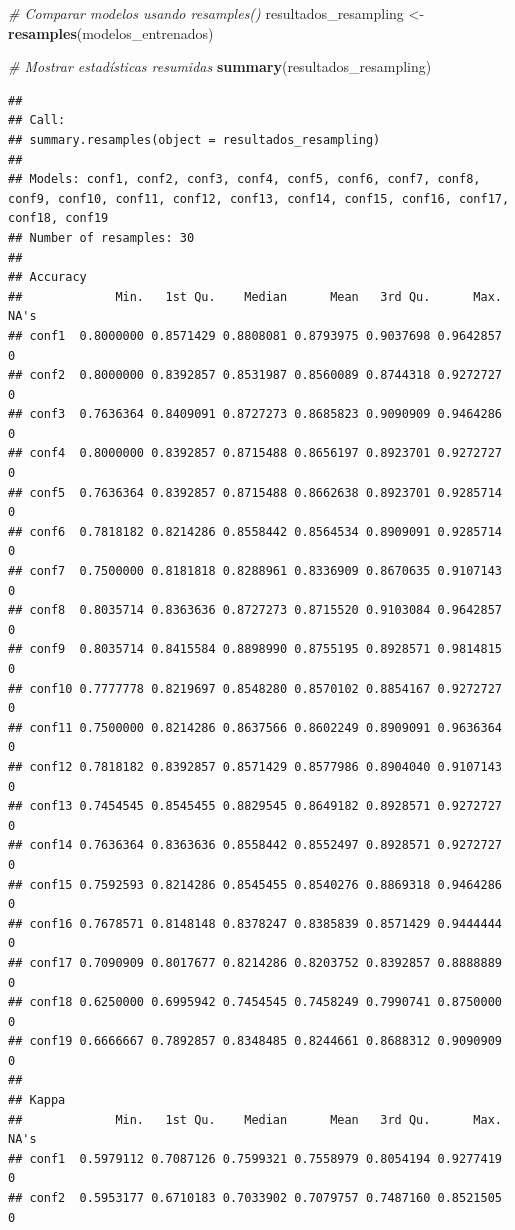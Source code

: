 \documentclass[
]{article}
\newenvironment{Shaded}{\begin{snugshade}}{\end{snugshade}}
\newcommand{\CommentTok}[1]{\textcolor[rgb]{0.56,0.35,0.01}{\textit{#1}}}
\newcommand{\FunctionTok}[1]{\textcolor[rgb]{0.13,0.29,0.53}{\textbf{#1}}}
\newcommand{\NormalTok}[1]{#1}
\newcommand{\OtherTok}[1]{\textcolor[rgb]{0.56,0.35,0.01}{#1}}
\begin{document}
\begin{Shaded}
\begin{Highlighting}[]
\CommentTok{\# Comparar modelos usando resamples()}
\NormalTok{resultados\_resampling }\OtherTok{\textless{}{-}} \FunctionTok{resamples}\NormalTok{(modelos\_entrenados)}

\CommentTok{\# Mostrar estadísticas resumidas}
\FunctionTok{summary}\NormalTok{(resultados\_resampling)}
\end{Highlighting}
\end{Shaded}

\begin{verbatim}
## 
## Call:
## summary.resamples(object = resultados_resampling)
## 
## Models: conf1, conf2, conf3, conf4, conf5, conf6, conf7, conf8, conf9, conf10, conf11, conf12, conf13, conf14, conf15, conf16, conf17, conf18, conf19 
## Number of resamples: 30 
## 
## Accuracy 
##             Min.   1st Qu.    Median      Mean   3rd Qu.      Max. NA's
## conf1  0.8000000 0.8571429 0.8808081 0.8793975 0.9037698 0.9642857    0
## conf2  0.8000000 0.8392857 0.8531987 0.8560089 0.8744318 0.9272727    0
## conf3  0.7636364 0.8409091 0.8727273 0.8685823 0.9090909 0.9464286    0
## conf4  0.8000000 0.8392857 0.8715488 0.8656197 0.8923701 0.9272727    0
## conf5  0.7636364 0.8392857 0.8715488 0.8662638 0.8923701 0.9285714    0
## conf6  0.7818182 0.8214286 0.8558442 0.8564534 0.8909091 0.9285714    0
## conf7  0.7500000 0.8181818 0.8288961 0.8336909 0.8670635 0.9107143    0
## conf8  0.8035714 0.8363636 0.8727273 0.8715520 0.9103084 0.9642857    0
## conf9  0.8035714 0.8415584 0.8898990 0.8755195 0.8928571 0.9814815    0
## conf10 0.7777778 0.8219697 0.8548280 0.8570102 0.8854167 0.9272727    0
## conf11 0.7500000 0.8214286 0.8637566 0.8602249 0.8909091 0.9636364    0
## conf12 0.7818182 0.8392857 0.8571429 0.8577986 0.8904040 0.9107143    0
## conf13 0.7454545 0.8545455 0.8829545 0.8649182 0.8928571 0.9272727    0
## conf14 0.7636364 0.8363636 0.8558442 0.8552497 0.8928571 0.9272727    0
## conf15 0.7592593 0.8214286 0.8545455 0.8540276 0.8869318 0.9464286    0
## conf16 0.7678571 0.8148148 0.8378247 0.8385839 0.8571429 0.9444444    0
## conf17 0.7090909 0.8017677 0.8214286 0.8203752 0.8392857 0.8888889    0
## conf18 0.6250000 0.6995942 0.7454545 0.7458249 0.7990741 0.8750000    0
## conf19 0.6666667 0.7892857 0.8348485 0.8244661 0.8688312 0.9090909    0
## 
## Kappa 
##             Min.   1st Qu.    Median      Mean   3rd Qu.      Max. NA's
## conf1  0.5979112 0.7087126 0.7599321 0.7558979 0.8054194 0.9277419    0
## conf2  0.5953177 0.6710183 0.7033902 0.7079757 0.7487160 0.8521505    0

\end{verbatim}
\end{document}
